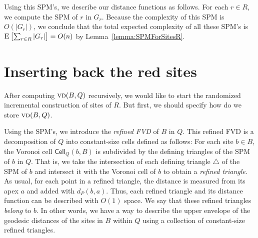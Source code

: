 \documentclass[a4paper,UKenglish]{socg-lipics-v2018}
\newcommand{\s}{\mathcal S}
\newcommand{\dd}[3][P]{\ensuremath{d_{#1}(#2, #3)}}
\newcommand{\p}[3][P]{\ensuremath{\pi_{_{#1}}(#2, #3)}}
\newcommand{\cell}[2][P]{\ensuremath{\mathsf{Cell}_{\scriptscriptstyle #1}(#2)}}
\newcommand{\vd}[2][P]{\textsc{vd}(#2, #1)}
\newcommand{\ex}[1]{\textsc{E}\left[#1\right]}
\begin{document}
Using this SPM's, we describe our distance functions as follows.
For each $r\in R$, we compute the SPM of $r$ in $G_r$.
Because the complexity of this SPM is $O(|G_r|)$, we conclude that the total expected complexity of all these SPM's is $\ex{\sum_{r\in R} |G_r|} = O(n)$ by Lemma~\ref{lemma:SPMForSitesR}.


\section{Inserting back the red sites}\label{section: Insertion process}

After computing $\vd[Q]{B}$ recursively, we would like to start the randomized incremental construction of sites of $R$. 
But first, we should specify how do we store $\vd[Q]{B}$. 


Using the SPM's, we introduce the \emph{refined FVD} of $B$ in $Q$.
This refined FVD is a decomposition of $Q$ into constant-size cells defined as follows:
For each site $b\in B$, the Voronoi cell $\cell[Q]{b, B}$ is subdivided by the defining triangles of the SPM of $b$ in $Q$. 
That is, we take the intersection of each defining triangle $\triangle$ of the SPM of $b$ and intersect it with the Voronoi cell of $b$ to obtain a \emph{refined triangle}. 
As usual, for each point in a refined triangle, the distance is measured from its apex $a$ and added with $\dd{b}{a}$. 
Thus, each refined triangle and its distance function can be described with $O(1)$ space. We say that these refined triangles \emph{belong} to $b$. 
In other words, we have a way to describe the upper envelope of the geodesic distances of the sites in $B$ within $Q$ using a collection of constant-size refined triangles. 
\end{document}
